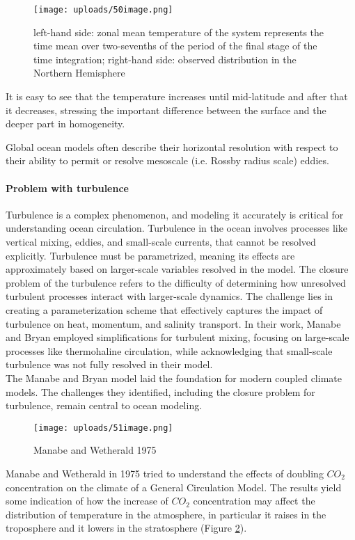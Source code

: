 \begin{figure}[h!]
	\centering
	\texttt{[image: uploads/50image.png]}
	\caption{left-hand side: zonal mean temperature of the system represents the time mean over two-sevenths of the period of the final stage of the time integration; right-hand side: observed distribution in the Northern Hemisphere}
	\label{fig:result}
\end{figure}

It is easy to see that the temperature increases until mid-latitude and after that it decreases, stressing the important difference between the surface and the deeper part in homogeneity.

Global ocean models often describe their horizontal
resolution with respect to their ability to permit or
resolve mesoscale (i.e. Rossby radius scale) eddies.

\paragraph{Problem with turbulence}
Turbulence is a complex phenomenon, and modeling it accurately is critical for understanding ocean circulation. Turbulence in the ocean involves processes like vertical mixing, eddies, and small-scale currents, that cannot be resolved explicitly. Turbulence must be parametrized, meaning its effects are approximately based on larger-scale variables resolved in the model. The closure problem of the turbulence refers to the difficulty of determining how unresolved turbulent processes interact with larger-scale dynamics. The challenge lies in creating a parameterization scheme that effectively captures the impact of turbulence on heat, momentum, and salinity transport. In their work, Manabe and Bryan employed simplifications for turbulent mixing, focusing on large-scale processes like thermohaline circulation, while acknowledging that small-scale turbulence was not fully resolved in their model.\\


The Manabe and Bryan model laid the foundation for modern coupled climate models. The challenges they identified, including the closure problem for turbulence, remain central to ocean modeling.
\begin{figure}[htpb]
	\centering
	\texttt{[image: uploads/51image.png]}
	\caption{Manabe and Wetherald 1975}
	\label{fig:fig 51}
\end{figure}


Manabe and Wetherald in 1975\cite{Manabe1975} tried to understand the effects of doubling $CO_2$ concentration on the climate of a General Circulation Model. The results yield some indication of how the increase of $CO_2$ concentration may affect the distribution of temperature in the atmosphere, in particular it raises in the troposphere and it lowers in the stratosphere (Figure \ref{fig:fig 51}).


